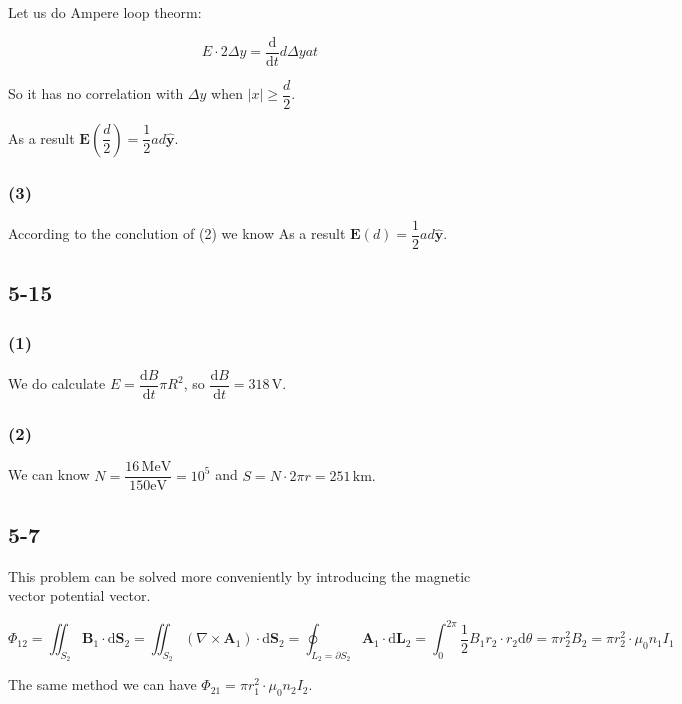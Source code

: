 \documentclass[a4paper,11pt]{amsart}
\theoremstyle{definition}
\begin{document}
	Let us do Ampere loop theorm:
	
	$$
	E\cdot2\Delta y=\dfrac{\mathrm{d}}{\mathrm{d}t}d\Delta yat
	$$
	
	So it has no correlation with $\Delta y$ when $|x|\geqslant\dfrac{d}{2}.$
	
	As a result $\bm{E}\left(\dfrac{d}{2}\right)=\dfrac{1}{2}ad\bm{\hat{y}}$.
	
	\subsubsection*{(3)}
	
	According to the conclution of (2) we know As a result $\bm{E}(d)=\dfrac{1}{2}ad\bm{\hat{y}}$.
	
	\subsection*{5-15}
	
	\subsubsection*{(1)}
	
	We do calculate $E=\dfrac{\mathrm{d}B}{\mathrm{d}t}\pi R^2$, so $\dfrac{\mathrm{d}B}{\mathrm{d}t}=318\,\mathrm{V}.$
	
	\subsubsection*{(2)}
	
	We can know $N=\dfrac{16\,\mathrm{MeV}}{150\mathrm{eV}}=10^5$ and $S=N\cdot2\pi r=251\,\mathrm{km}.$
	
	\subsection*{5-7}
	
	This problem can be solved more conveniently by introducing the magnetic vector potential vector.
	
	$$
	\varPhi _{12}=\iint_{S_2}{\boldsymbol{B}_1\cdot \mathrm{d}\boldsymbol{S}_2}=\iint_{S_2}{\left( \nabla \times \boldsymbol{A}_1 \right) \cdot \mathrm{d}\boldsymbol{S}_2}=\oint_{L_2=\partial S_2}{\boldsymbol{A}_1\cdot \mathrm{d}\boldsymbol{L}_2}=\int_0^{2\pi}{\frac{1}{2}B_1r_2\cdot r_2\mathrm{d}\theta}=\pi r_{2}^{2}B_2=\pi r_2^2\cdot\mu_0n_1I_1
	$$
	
	The same method we can have $\displaystyle\varPhi _{21}=\pi r_{1}^{2}\cdot\mu_0n_2I_2.$
	
\end{document}
